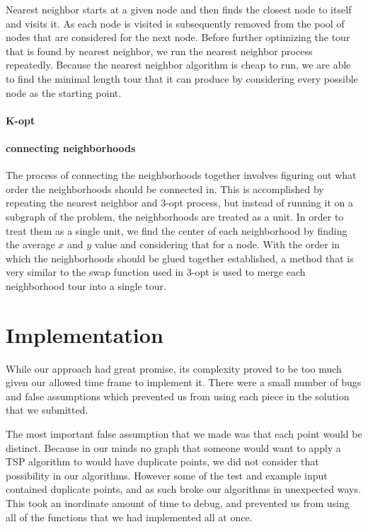\documentclass[12pt]{article}
\begin{document}
Nearest neighbor starts at a given node and then finds the closest node to
itself and visits it. As each node is visited is subsequently removed from the
pool of nodes that are considered for the next node. Before further optimizing
the tour that is found by nearest neighbor, we run the nearest neighbor process
repeatedly. Because the nearest neighbor algorithm is cheap to run, we are able
to find the minimal length tour that it can produce by considering every
possible node as the starting point. 

\paragraph{K-opt}

\paragraph{connecting neighborhoods}

The process of connecting the neighborhoods together involves figuring out what
order the neighborhoods should be connected in. This is accomplished by
repeating the nearest neighbor and 3-opt process, but instead of running it on
a subgraph of the problem, the neighborhoods are treated as a unit.  In order
to treat them as a single unit, we find the center of each neighborhood by
finding the average $x$ and $y$ value and considering that for a node.  With
the order in which the neighborhoods should be glued together established, a
method that is very similar to the swap function used in 3-opt is used to merge
each neighborhood tour into a single tour.


\section*{Implementation}

While our approach had great promise, its complexity proved to be too much
given our allowed time frame to implement it.  There were a small number of
bugs and false assumptions which prevented us from using each piece in the
solution that we submitted.

The most important false assumption that we made was that each point would be
distinct.  Because in our minds no graph that someone would want to apply a TSP
algorithm to would have duplicate points, we did not consider that possibility
in our algorithms.  However some of the test and example input contained
duplicate points, and as such broke our algorithms in unexpected ways.  This
took an inordinate amount of time to debug, and prevented us from using all of
the functions that we had implemented all at once.
\end{document}
